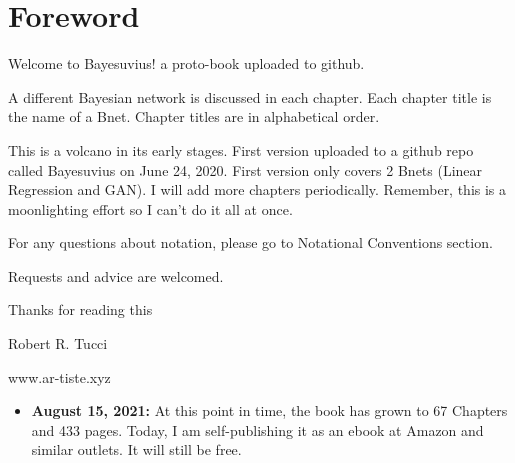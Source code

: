 \chapter*{Foreword}

Welcome to Bayesuvius! a proto-book uploaded to github.

A different Bayesian network is discussed
 in each chapter. Each chapter title is 
the name of a Bnet. Chapter titles are
 in alphabetical order.

This is a volcano in its early stages.
 First version uploaded to a github repo 
called Bayesuvius on June 24, 2020. 
First version only covers 2 Bnets
(Linear Regression and GAN). 
I will add more chapters periodically.
 Remember, this is a moonlighting effort 
so I can't do it all at once.

For any questions about notation, 
please go to Notational Conventions section.

Requests and advice are welcomed.


\bigskip
\noindent Thanks for reading this

\noindent Robert R. Tucci

\noindent www.ar-tiste.xyz
\bigskip
\\
\begin{itemize}
\item{\bf August 15, 2021:} At 
this point in time, the book 
has grown to 67 Chapters and 433 pages.
Today, I am self-publishing it as an ebook
at Amazon and similar outlets. It
will still be free.
\end{itemize}

